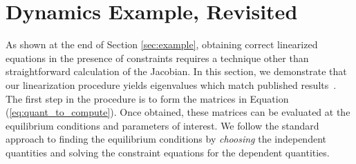 \documentclass[smallcondensed,final]{svjour3}                     %
\begin{document}
%
%
%

%

\section{Dynamics Example, Revisited}
\label{sec:example_revisited}
As shown at the end of Section \ref{sec:example}, obtaining correct linearized
equations in the presence of constraints requires a technique other than
straightforward calculation of the Jacobian. In this section, we demonstrate
that our linearization procedure yields eigenvalues which match published
results~\cite{Schwab2003,Kane1985,Neimark1972}. The first step in the procedure
is to form the matrices in Equation (\ref{eq:quant_to_compute}). Once obtained,
these matrices can be evaluated at the equilibrium conditions and parameters of
interest. We follow the standard approach to finding the equilibrium conditions
by \textit{choosing} the independent quantities and solving the constraint
equations for the dependent quantities.
\end{document}
